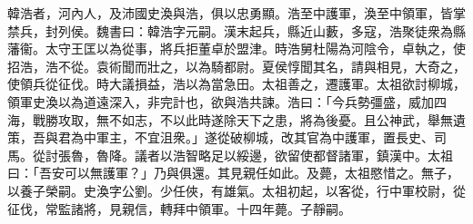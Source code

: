 \begin{pinyinscope}
韓浩者，河內人，及沛國史渙與浩，俱以忠勇顯。浩至中護軍，渙至中領軍，皆掌禁兵，封列侯。魏書曰：韓浩字元嗣。漢末起兵，縣近山藪，多寇，浩聚徒衆為縣藩衞。太守王匡以為從事，將兵拒董卓於盟津。時浩舅杜陽為河陰令，卓執之，使招浩，浩不從。袁術聞而壯之，以為騎都尉。夏侯惇聞其名，請與相見，大奇之，使領兵從征伐。時大議損益，浩以為當急田。太祖善之，遷護軍。太祖欲討柳城，領軍史渙以為道遠深入，非完計也，欲與浩共諫。浩曰：「今兵勢彊盛，威加四海，戰勝攻取，無不如志，不以此時遂除天下之患，將為後憂。且公神武，舉無遺策，吾與君為中軍主，不宜沮衆。」遂從破柳城，改其官為中護軍，置長史、司馬。從討張魯，魯降。議者以浩智略足以綏邊，欲留使都督諸軍，鎮漢中。太祖曰：「吾安可以無護軍？」乃與俱還。其見親任如此。及薨，太祖愍惜之。無子，以養子榮嗣。史渙字公劉。少任俠，有雄氣。太祖初起，以客從，行中軍校尉，從征伐，常監諸將，見親信，轉拜中領軍。十四年薨。子靜嗣。


\end{pinyinscope}